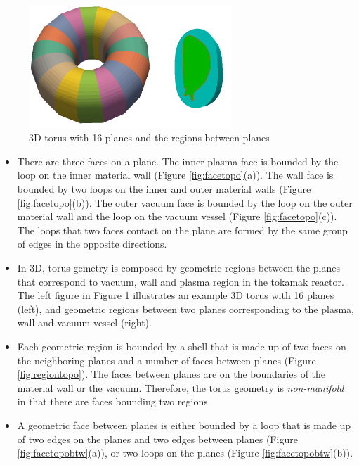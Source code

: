 \documentclass[11pt]{article}  %
\begin{document}
\begin{figure}
\center
\includegraphics[width=3in]{fig/3dGeoTorus.png}
\caption{\small{3D torus with 16 planes and the regions between planes}}
\label{fig:3dtopo}
\end{figure}

\begin{itemize}
\item There are three faces on a plane. The inner plasma face is bounded by the loop on the inner material wall (Figure \ref{fig:facetopo}(a)). The wall face is bounded by two loops on the inner and outer material walls (Figure \ref{fig:facetopo}(b)). The outer vacuum face is bounded by the loop on the outer material wall and the loop on the vacuum vessel (Figure \ref{fig:facetopo}(c)). The loops that two faces contact on the plane are formed by the same group of edges in the opposite directions. 

\item In 3D, torus gemetry is composed by geometric regions between the planes that correspond to vacuum, wall and plasma region in the tokamak reactor. The left figure in Figure \ref{fig:3dtopo} illustrates an example 3D torus with 16 planes (left), and geometric regions between two planes corresponding to the plasma, wall and vacuum vessel (right).

\item Each geometric region is bounded by a shell that is made up of two faces on the neighboring planes and a number of faces between planes (Figure \ref{fig:regiontopo}). The faces between planes are on the boundaries of the material wall or the vacuum. Therefore, the torus geometry is \emph{non-manifold} \cite{weiler1986topo} in that there are faces bounding two regions. 
\item A geometric face between planes is either bounded by a loop that is made up of two edges on the planes and two edges between planes (Figure \ref{fig:facetopobtw}(a)), or two loops on the planes (Figure \ref{fig:facetopobtw}(b)).
\end{itemize}
\end{document}
